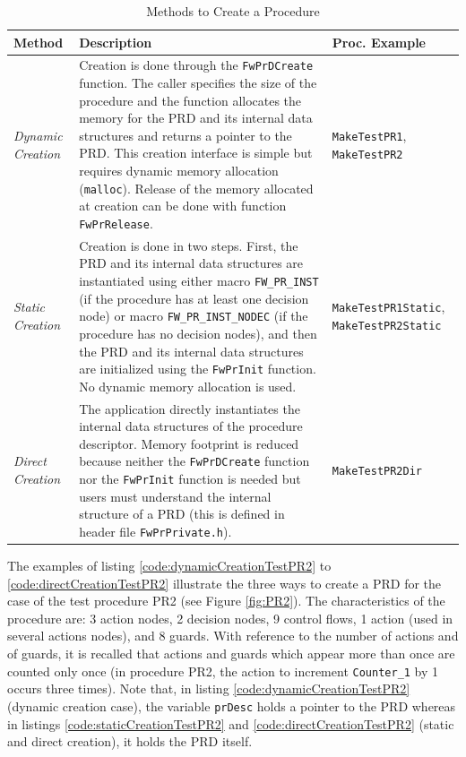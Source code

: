 \documentclass[manual]{../fwprofile}
\begin{document}
\begin{longtable}{|p{1.5cm}|p{6cm}|p{3cm}|}
\caption{Methods to Create a Procedure} \label{tab:prCreation}\\
\hline
\rowcolor{gray}
\textbf{Method} & \textbf{Description} & \textbf{Proc. Example}\\
\hline\hline
\emph{Dynamic Creation}  & Creation is done through the \texttt{FwPrDCreate} function. The caller specifies 
the size of the procedure and the function allocates the memory for the PRD and its internal data 
structures and returns a pointer to the PRD. This creation interface is simple but requires dynamic memory 
allocation (\texttt{malloc}). Release of the memory allocated at creation can be done with function \texttt{FwPrRelease}. 
& \texttt{MakeTestPR1}, \texttt{MakeTestPR2} \\
\hline
\emph{Static Creation} & Creation is done in two steps. First, the PRD and its internal data structures are 
instantiated using either macro \texttt{FW\_PR\_INST} (if the procedure has at least one decision node) or
macro \texttt{FW\_PR\_INST\_NODEC} (if the procedure has no decision nodes), and then the PRD and its 
internal data structures are initialized 
using the \texttt{FwPrInit} function. No dynamic memory allocation is used. & \texttt{MakeTestPR1Static}, \texttt{MakeTestPR2Static}\\
\hline
\emph{Direct Creation} & The application directly instantiates the internal data structures of the procedure 
descriptor. Memory footprint is reduced because neither the \texttt{FwPrDCreate} function nor the \texttt{FwPrInit} 
function is needed but users must understand the internal structure of a PRD (this is defined in header 
file \texttt{FwPrPrivate.h}). & \texttt{MakeTestPR2Dir} \\
\hline
\end{longtable}

\newpage

The examples of listing \ref{code:dynamicCreationTestPR2} to \ref{code:directCreationTestPR2} illustrate the 
three ways to create a PRD for the case of the test procedure PR2 
(see Figure \ref{fig:PR2}). The characteristics of the procedure are: 3 action nodes, 2 decision nodes, 
9 control flows, 1 action (used in several actions nodes), and 8 guards. 
With reference to the number of actions and of guards, it is recalled that actions and guards which appear 
more than once  are counted only once 
(in procedure PR2, the action to increment \texttt{Counter\_1} by 1 occurs three times).
Note that, in listing \ref{code:dynamicCreationTestPR2} (dynamic creation case), the variable \texttt{prDesc} 
holds a pointer to the PRD whereas in listings \ref{code:staticCreationTestPR2} and \ref{code:directCreationTestPR2} 
(static and direct creation), it holds the PRD itself.
\end{document}
